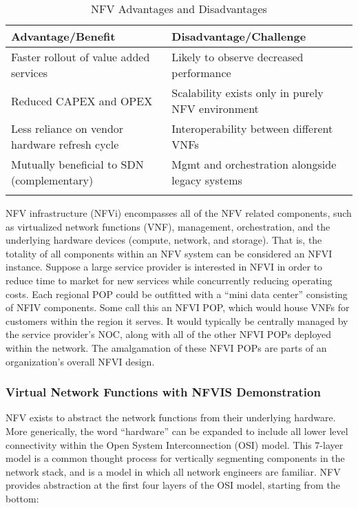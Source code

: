 \begin{longtable}{ll}
\toprule
\textbf{Advantage/Benefit}
&
\textbf{Disadvantage/Challenge}
\\ \midrule
Faster rollout of value added services
&
Likely to observe decreased performance
\\ \midrule
Reduced CAPEX and OPEX
&
Scalability exists only in purely NFV environment
\\ \midrule
Less reliance on vendor hardware refresh cycle
&
Interoperability between different VNFs
\\ \midrule
Mutually beneficial to SDN (complementary)
&
Mgmt and orchestration alongside legacy systems
\\
\bottomrule
\caption{NFV Advantages and Disadvantages}
\end{longtable}

NFV infrastructure (NFVi) encompasses all of the NFV related components, such
as virtualized network functions (VNF), management, orchestration, and the
underlying hardware devices (compute, network, and storage). That is, the
totality of all components within an NFV system can be considered an NFVI
instance. Suppose a large service provider is interested in NFVI in order to
reduce time to market for new services while concurrently reducing operating
costs. Each regional POP could be outfitted with a ``mini data center''
consisting of NFIV components. Some call this an NFVI POP, which would house
VNFs for customers within the region it serves. It would typically be
centrally managed by the service provider's NOC, along with all of the other
NFVI POPs deployed within the network. The amalgamation of these NFVI POPs are
parts of an organization's overall NFVI design.

\subsubsection{Virtual Network Functions with NFVIS Demonstration}
NFV exists to abstract the network functions from their underlying hardware.
More generically, the word ``hardware'' can be expanded to include all lower
level connectivity within the Open System Interconnection (OSI) model. This
7-layer model is a common thought process for vertically segmenting components
in the network stack, and is a model in which all network engineers are
familiar. NFV provides abstraction at the first four layers of the OSI model,
starting from the bottom:

